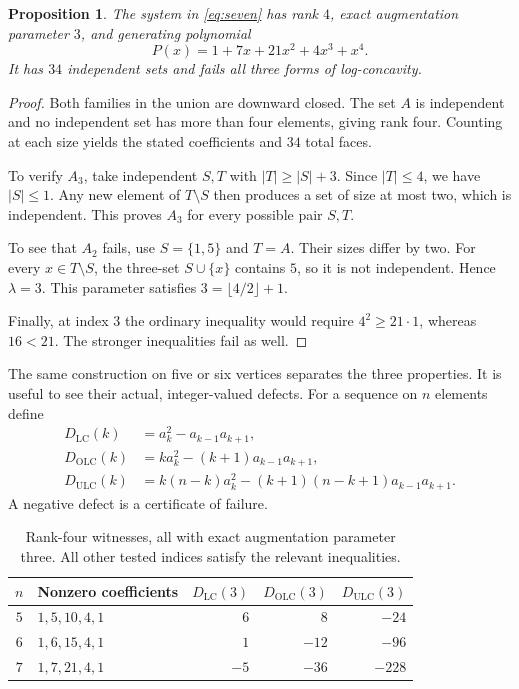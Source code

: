 \documentclass[11pt,letterpaper]{article}
\numberwithin{equation}{section}
\newtheorem{proposition}[theorem]{Proposition}
\theoremstyle{definition}
\theoremstyle{remark}
\newcommand{\LC}{\mathrm{LC}}
\newcommand{\OLC}{\mathrm{OLC}}
\newcommand{\ULC}{\mathrm{ULC}}
\begin{document}
\begin{proposition}\label{prop:seven}
The system in \eqref{eq:seven} has rank $4$, exact augmentation parameter
$3$, and generating polynomial
\[
 P(x)=1+7x+21x^2+4x^3+x^4.
\]
It has $34$ independent sets and fails all three forms of log-concavity.
\end{proposition}
\begin{proof}
Both families in the union are downward closed. The set $A$ is independent
and no independent set has more than four elements, giving rank four.
Counting at each size yields the stated coefficients and $34$ total faces.

To verify $A_3$, take independent $S,T$ with $|T|\ge|S|+3$.
Since $|T|\le4$, we have $|S|\le1$. Any new element of $T\setminus S$
then produces a set of size at most two, which is independent. This proves
$A_3$ for every possible pair $S,T$.

To see that $A_2$ fails, use $S=\{1,5\}$ and $T=A$.
Their sizes differ by two. For every $x\in T\setminus S$, the three-set
$S\cup\{x\}$ contains $5$, so it is not independent. Hence $\lambda=3$.
This parameter satisfies $3=\lfloor4/2\rfloor+1$.

Finally, at index $3$ the ordinary inequality would require
$4^2\ge21\cdot1$, whereas $16<21$. The stronger inequalities fail as well.
\end{proof}

The same construction on five or six vertices separates the three
properties. It is useful to see their actual, integer-valued defects.
For a sequence on $n$ elements define
\begin{align*}
 D_{\LC}(k)&=a_k^2-a_{k-1}a_{k+1},\\
 D_{\OLC}(k)&=k a_k^2-(k+1)a_{k-1}a_{k+1},\\
 D_{\ULC}(k)&=k(n-k)a_k^2-(k+1)(n-k+1)a_{k-1}a_{k+1}.
\end{align*}
A negative defect is a certificate of failure.
\begin{table}[ht]
\centering
\begin{tabular}{@{}c l r r r@{}}
\toprule
$n$ & Nonzero coefficients & $D_{\LC}(3)$ & $D_{\OLC}(3)$ & $D_{\ULC}(3)$\\
\midrule
$5$ & $1,5,10,4,1$ & $6$ & $8$ & $-24$\\
$6$ & $1,6,15,4,1$ & $1$ & $-12$ & $-96$\\
$7$ & $1,7,21,4,1$ & $-5$ & $-36$ & $-228$\\
\bottomrule
\end{tabular}
\caption{Rank-four witnesses, all with exact augmentation parameter three.
All other tested indices satisfy the relevant inequalities.}
\label{tab:small}
\end{table}
\end{document}

